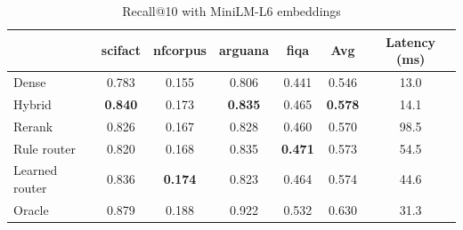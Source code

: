 \begin{table}[t]
\centering
\caption{Recall@10 with MiniLM-L6 embeddings}
\label{tab:recall_MiniLM-L6}
\begin{tabular}{lcccccc}
\toprule
 & scifact & nfcorpus & arguana & fiqa & Avg & Latency (ms) \\
\midrule
Dense & 0.783 & 0.155 & 0.806 & 0.441 & 0.546 & 13.0 \\
Hybrid & \textbf{0.840} & 0.173 & \textbf{0.835} & 0.465 & \textbf{0.578} & 14.1 \\
Rerank & 0.826 & 0.167 & 0.828 & 0.460 & 0.570 & 98.5 \\
\midrule
Rule router & 0.820 & 0.168 & 0.835 & \textbf{0.471} & 0.573 & 54.5 \\
Learned router & 0.836 & \textbf{0.174} & 0.823 & 0.464 & 0.574 & 44.6 \\
Oracle & 0.879 & 0.188 & 0.922 & 0.532 & 0.630 & 31.3 \\
\bottomrule
\end{tabular}
\end{table}